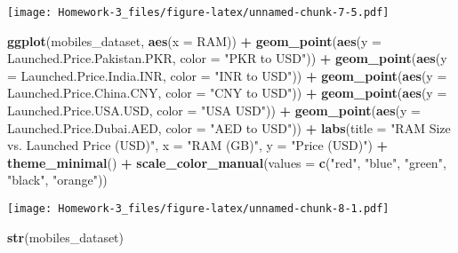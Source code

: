 \documentclass[
]{article}
\newenvironment{Shaded}{\begin{snugshade}}{\end{snugshade}}
\newcommand{\AttributeTok}[1]{\textcolor[rgb]{0.13,0.29,0.53}{#1}}
\newcommand{\FunctionTok}[1]{\textcolor[rgb]{0.13,0.29,0.53}{\textbf{#1}}}
\newcommand{\NormalTok}[1]{#1}
\newcommand{\SpecialCharTok}[1]{\textcolor[rgb]{0.81,0.36,0.00}{\textbf{#1}}}
\newcommand{\StringTok}[1]{\textcolor[rgb]{0.31,0.60,0.02}{#1}}
\begin{document}
\texttt{[image: Homework-3\_files/figure-latex/unnamed-chunk-7-5.pdf]}

\begin{Shaded}
\begin{Highlighting}[]
\FunctionTok{ggplot}\NormalTok{(mobiles\_dataset, }\FunctionTok{aes}\NormalTok{(}\AttributeTok{x =}\NormalTok{ RAM)) }\SpecialCharTok{+}
  \FunctionTok{geom\_point}\NormalTok{(}\FunctionTok{aes}\NormalTok{(}\AttributeTok{y =}\NormalTok{ Launched.Price.Pakistan.PKR, }\AttributeTok{color =} \StringTok{"PKR to USD"}\NormalTok{)) }\SpecialCharTok{+}
  \FunctionTok{geom\_point}\NormalTok{(}\FunctionTok{aes}\NormalTok{(}\AttributeTok{y =}\NormalTok{ Launched.Price.India.INR, }\AttributeTok{color =} \StringTok{"INR to USD"}\NormalTok{)) }\SpecialCharTok{+}
  \FunctionTok{geom\_point}\NormalTok{(}\FunctionTok{aes}\NormalTok{(}\AttributeTok{y =}\NormalTok{ Launched.Price.China.CNY, }\AttributeTok{color =} \StringTok{"CNY to USD"}\NormalTok{)) }\SpecialCharTok{+}
  \FunctionTok{geom\_point}\NormalTok{(}\FunctionTok{aes}\NormalTok{(}\AttributeTok{y =}\NormalTok{ Launched.Price.USA.USD, }\AttributeTok{color =} \StringTok{"USA USD"}\NormalTok{)) }\SpecialCharTok{+}
  \FunctionTok{geom\_point}\NormalTok{(}\FunctionTok{aes}\NormalTok{(}\AttributeTok{y =}\NormalTok{ Launched.Price.Dubai.AED, }\AttributeTok{color =} \StringTok{"AED to USD"}\NormalTok{)) }\SpecialCharTok{+}
  \FunctionTok{labs}\NormalTok{(}\AttributeTok{title =} \StringTok{"RAM Size vs. Launched Price (USD)"}\NormalTok{, }\AttributeTok{x =} \StringTok{"RAM (GB)"}\NormalTok{, }\AttributeTok{y =} \StringTok{"Price (USD)"}\NormalTok{) }\SpecialCharTok{+}
  \FunctionTok{theme\_minimal}\NormalTok{() }\SpecialCharTok{+}
  \FunctionTok{scale\_color\_manual}\NormalTok{(}\AttributeTok{values =} \FunctionTok{c}\NormalTok{(}\StringTok{"red"}\NormalTok{, }\StringTok{"blue"}\NormalTok{, }\StringTok{"green"}\NormalTok{, }\StringTok{"black"}\NormalTok{, }\StringTok{"orange"}\NormalTok{))}
\end{Highlighting}
\end{Shaded}

\texttt{[image: Homework-3\_files/figure-latex/unnamed-chunk-8-1.pdf]}

\begin{Shaded}
\begin{Highlighting}[]
\FunctionTok{str}\NormalTok{(mobiles\_dataset)}
\end{Highlighting}
\end{Shaded}
\end{document}
